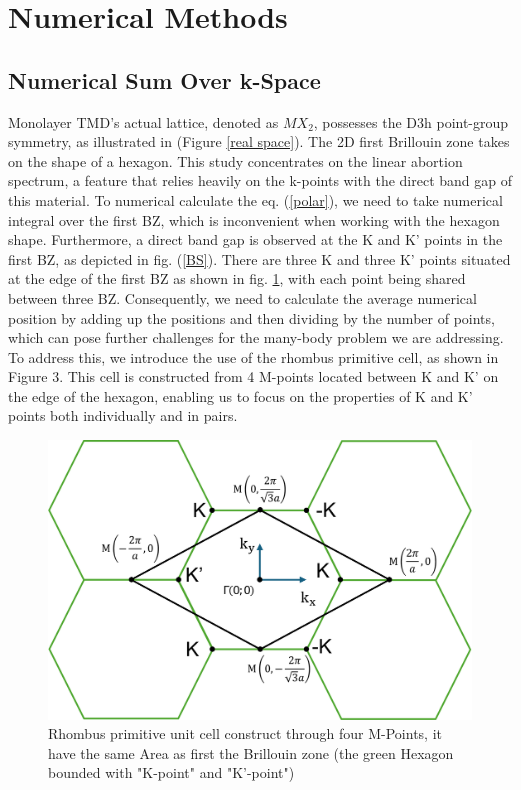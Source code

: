 \documentclass[12pt,english,a4paper]{article}
\begin{document}
\section{Numerical Methods}
\subsection{Numerical Sum Over k-Space}
\quad Monolayer TMD's actual lattice, denoted as $MX_2$, possesses the D3h point-group symmetry, as illustrated in (Figure \ref{real space}). The 2D first Brillouin zone takes on the shape of a hexagon. This study concentrates on the linear abortion spectrum, a feature that relies heavily on the k-points with the direct band gap of this material. To numerical calculate the eq. (\ref{polar}), we need to take numerical integral over the first BZ, which is inconvenient when working with the hexagon shape. Furthermore, a direct band gap is observed at the K and K' points in the first BZ, as depicted in fig. (\ref{BS}). There are three K and three K' points situated at the edge of the first BZ as shown in fig. \ref{Rhombus}, with each point being shared between three BZ. Consequently, we need to calculate the average numerical position by adding up the positions and then dividing by the number of points, which can pose further challenges for the many-body problem we are addressing.\\\null
\quad To address this, we introduce the use of the rhombus primitive cell, as shown in Figure 3. This cell is constructed from 4 M-points located between K and K' on the edge of the hexagon, enabling us to focus on the properties of K and K' points both individually and in pairs.
\begin{figure}
	\begin{center}
\includegraphics[width= 0.75\linewidth]{Images/Rhombus.pdf}
\caption[Rhombus primitive unit cell in compare with hexagon primitive unit cell (the first Brillouin zone)]{Rhombus primitive unit cell construct through four M-Points, it have the same Area as first the Brillouin zone (the green Hexagon bounded with "K-point" and "K'-point")}
\label{Rhombus}
	\end{center}
\end{figure}\\\null
\end{document}

